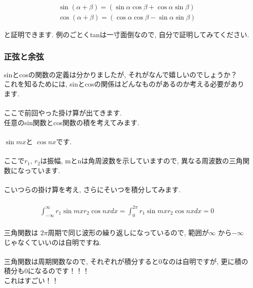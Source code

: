 \documentclass[11pt,a4paper]{jsarticle}
\begin{document}
\begin{eqnarray}
\sin (\alpha + \beta) = (\sin\alpha\cos\beta + \cos\alpha\sin\beta)\\
\cos (\alpha + \beta) = (\cos\alpha\cos\beta - \sin\alpha\sin\beta)
\label{kahouteiri}
\end{eqnarray}

と証明できます. 例のごとくtanは一寸面倒なので, 自分で証明してみてください.\\
\subsubsection{正弦と余弦}
sinとcosの関数の定義は分かりましたが, それがなんで嬉しいのでしょうか？\\
これを知るためには, sinとcosの関係はどんなものがあるのか考える必要があります.\\
\\
ここで前回やった掛け算が出てきます. \\
任意のsin関数とcos関数の積を考えてみます.\\
\\
$\sin mx $と $\cos nx $です.\\
\\
ここで$r_1$, $r_2$は振幅, mとnは角周波数を示していますので, 異なる周波数の三角関数になっています.\\
\\
こいつらの掛け算を考え, さらにそいつを積分してみます.\\
\\
\begin{eqnarray}
  \int^\infty_{-\infty} r_1\sin mx r_2\cos nx dx = \int^{2\pi}_0 r_1\sin mx r_2\cos nx dx = 0
\end{eqnarray}
\\
三角関数は $2\pi$周期で同じ波形の繰り返しになっているので, 範囲が$\infty$ から$-\infty$じゃなくていいのは自明ですね.\\
\\
三角関数は周期関数なので, それぞれが積分すると0なのは自明ですが, 更に積の積分も0になるのです！！！\\
これはすごい！！\\
\\
\end{document}
